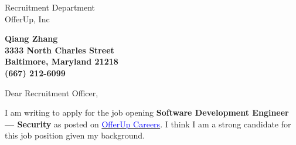 \documentclass[11pt]{letter} %
\begin{document}

\begin{letter}{Recruitment Department \\
OfferUp, Inc} 


\begin{center}
\large\bf Qiang Zhang \\ %
3333 North Charles Street \\ Baltimore, Maryland 21218 \\ (667) 212-6099 %
\end{center} 
\vfill

\signature{Qiang Zhang} %


\opening{Dear Recruitment Officer,} 
 

I am writing to apply for the job opening \textbf{Software Development Engineer --- Security} as posted on \href{https://about.offerup.com/careers/engineering/software-development-engineer-security/}{\textcolor{blue}{OfferUp Careers}}. I think I am a strong candidate for this job position given my background.



\end{letter}
\end{document}
